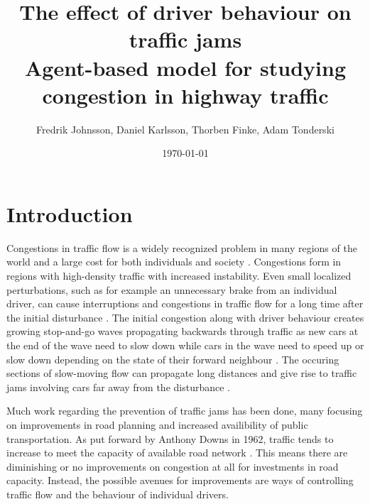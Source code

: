 \documentclass[11pt,a4paper,twocolumn]{article}
\begin{document}
\title{%
  The effect of driver behaviour on traffic jams \\
  \large Agent-based model for studying congestion in highway traffic}
\author{Fredrik Johnsson, Daniel Karlsson, Thorben Finke, Adam Tonderski}
\date{\today}

\twocolumn[
  \begin{@twocolumnfalse}
    \maketitle
    \begin{abstract}
        \noindent
    \end{abstract}
  \end{@twocolumnfalse}
]

\newpage
\tableofcontents

\section{Introduction}
Congestions in traffic flow is a widely recognized problem in many regions of the world and a large cost for both individuals and society \cite{inrix}. Congestions form in regions with high-density traffic with increased instability. Even small localized perturbations, such as for example an unnecessary brake from an individual driver, can cause interruptions and congestions in traffic flow for a long time after the initial disturbance \cite{kerner97flow, bando1995dynamical}. The initial congestion along with driver behaviour creates growing stop-and-go waves propagating backwards through traffic as new cars at the end of the wave need to slow down while cars in the wave need to speed up or slow down depending on the state of their forward neighbour  \cite{stern17autonomous, kerner96trafficjam}. The occuring sections of slow-moving flow can propagate long distances and give rise to traffic jams involving cars far away from the disturbance \cite{kerner96trafficjam}.

Much work regarding the prevention of traffic jams has been done, many focusing on improvements in road planning and increased availibility of public transportation. As put forward by Anthony Downs in 1962, traffic tends to increase to meet the capacity of available road network \cite{downs2000stuck, downs2005still, downs1962law}. This means there are diminishing or no improvements on congestion at all for investments in road capacity. Instead, the possible avenues for improvements are ways of controlling traffic flow and the behaviour of individual drivers.
\end{document}
